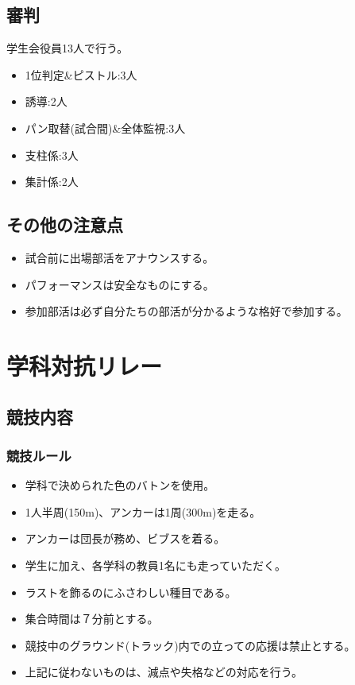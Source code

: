 \documentclass[titlepage]{jarticle}
\begin{document}
  \subsection{審判}
   学生会役員13人で行う。
   \begin{itemize}
   \item 1位判定\&ピストル:3人
   \item 誘導:2人
   \item パン取替(試合間)\&全体監視:3人
   \item 支柱係:3人
   \item 集計係:2人
   \end{itemize}
  \subsection{その他の注意点}
   \begin{itemize}
    \item 試合前に出場部活をアナウンスする。
    \item パフォーマンスは安全なものにする。
    \item 参加部活は必ず自分たちの部活が分かるような格好で参加する。
   \end{itemize}
\clearpage
 \section{学科対抗リレー}
  \subsection{競技内容}
   \subsubsection{競技ルール}
    \begin{itemize}
     \item 学科で決められた色のバトンを使用。
     \item 1人半周(150m)、アンカーは1周(300m)を走る。
     \item アンカーは団長が務め、ビブスを着る。
     \item 学生に加え、各学科の教員1名にも走っていただく。
     \item ラストを飾るのにふさわしい種目である。
     \item 集合時間は７分前とする。
     \item 競技中のグラウンド(トラック)内での立っての応援は禁止とする。
     \item 上記に従わないものは、減点や失格などの対応を行う。

    \end{itemize}
\end{document}
